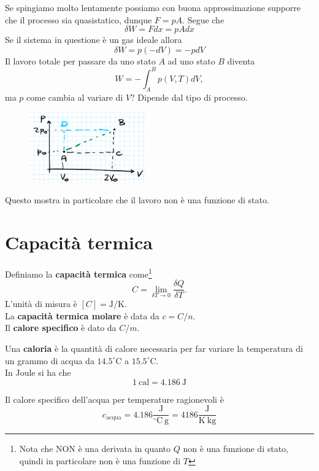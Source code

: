 \noindent
Se spingiamo molto lentamente possiamo con buona approssimazione supporre che il processo sia quasistatico, dunque $F=pA$. Segue che
\[\boxed{\delta W=Fdx=pAdx}\]
Se il sistema in questione \`e un gas ideale allora
\[\delta W=p(-dV)=-pdV\]
Il lavoro totale per passare da uno stato $A$ ad uno stato $B$ diventa
\[W=-\int_{A}^{B} p(V,T)dV,\]
ma $p$ come cambia al variare di $V$? Dipende dal tipo di processo.

\begin{figure}[!htb]
	\centering
	\includegraphics[width=5cm]{images/Lavoro_non_e_funzione_di_stato.png}
\end{figure}

\noindent
Questo mostra in particolare che il lavoro non \`e una funzione di stato.

\section{Capacit\`a termica}
\begin{definition}
Definiamo la \textbf{capacit\`a termica} come\footnote{Nota che NON \`e una derivata in quanto $Q$ non \`e una funzione di stato, quindi in particolare non \`e una funzione di $T$}
\[C=\lim_{\delta T\to 0}\frac{\delta Q}{\delta T}.\]
L'unit\`a di misura \`e $[C]=\mathrm{J}/\mathrm{K}$.\\
La \textbf{capacit\`a termica molare} \`e data da $c=C/n$.\\
Il \textbf{calore specifico} \`e dato da $C/m$.
\end{definition}

\begin{definition}[Caloria]
Una \textbf{caloria} \`e la quantit\`a di calore necessaria per far variare la temperatura di un grammo di acqua da $14.5^\circ\mathrm{C}$ a $15.5^\circ\mathrm{C}$.\\
In Joule si ha che
\[\boxed{1\ \mathrm{cal}=4.186\ \mathrm{J}}\]
\end{definition}
\begin{remark}
Il calore specifico dell'acqua per temperature ragionevoli \`e
\[c_{\text{acqua}}=4.186\frac{\mathrm{J}}{^\circ\mathrm{C}\ \mathrm{g}}=4186\frac{\mathrm{J}}{\mathrm{K}\ \mathrm{kg}}\]
\end{remark}

